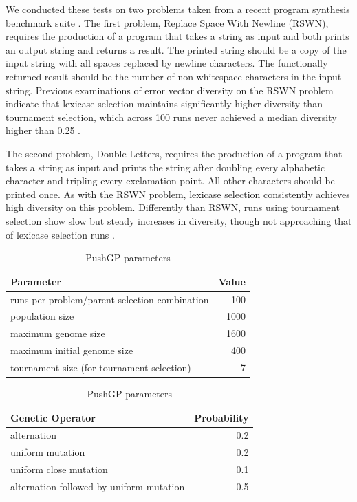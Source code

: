 \documentclass{sig-alternate-05-2015}
\begin{document}
We conducted these tests on two problems taken from a recent program synthesis benchmark suite \cite{Helmuth:2015:GECCO}. The first problem, Replace Space With Newline (RSWN), requires the production of a program that takes a string as input and both prints an output string and returns a result. The printed string should be a copy of the input string with all spaces replaced by newline characters. The functionally returned result should be the number of non-whitespace characters in the input string. Previous examinations of error vector diversity on the RSWN problem indicate that lexicase selection maintains significantly higher diversity than tournament selection, which across 100 runs never achieved a median diversity higher than 0.25 \cite{Helmuth:2015:GPTP}.

The second problem, Double Letters, requires the production of a program that takes a string as input and prints the string after doubling every alphabetic character and tripling every exclamation point. All other characters should be printed once. As with the RSWN problem, lexicase selection consistently achieves high diversity on this problem. Differently than RSWN, runs using tournament selection show slow but steady increases in diversity, though not approaching that of lexicase selection runs \cite{Helmuth:2015:GPTP}.

\begin{table}[t]
\centering
\caption{PushGP parameters}
\label{table:parameters}
\begin{tabular}{l r}
\toprule
\textbf{Parameter} & \textbf{Value} \tabularnewline
\midrule
runs per problem/parent selection combination & 100 \tabularnewline
population size & 1000 \tabularnewline
maximum genome size & 1600 \tabularnewline
maximum initial genome size & 400 \tabularnewline
tournament size (for tournament selection) & 7 \tabularnewline
\midrule
\end{tabular}
\begin{tabular}{l r}
\textbf{Genetic Operator} & \textbf{Probability} \tabularnewline
\midrule
alternation & 0.2 \tabularnewline
uniform mutation & 0.2 \tabularnewline
uniform close mutation & 0.1 \tabularnewline
alternation followed by uniform mutation & 0.5 \tabularnewline
\bottomrule
\end{tabular}
\end{table}
\end{document}
